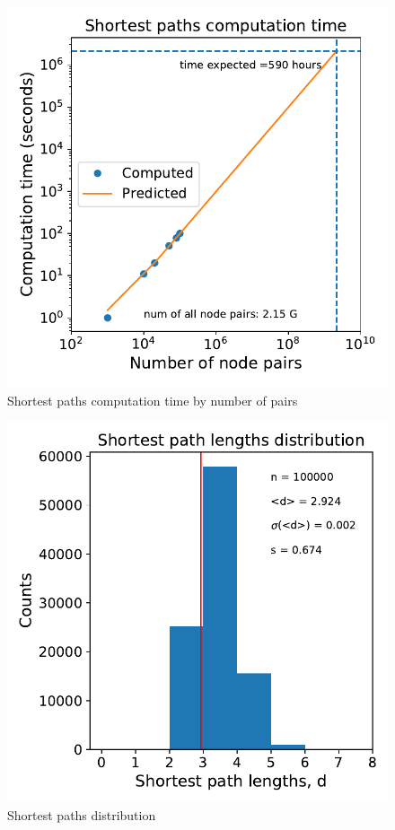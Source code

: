 \documentclass[12pt, twoside]{report}
\begin{document}
    
\begin{minipage}[b]{0.5\textwidth}
   \centering
    \begin{figure}[H]
      \includegraphics[width=\textwidth]{../../scripts/network_analysis/imgs/paths_computation_time.pdf}            
          \caption{Shortest paths computation time by number of pairs}
      \label{fig:path_time}
\end{figure}
\end{minipage}
\begin{minipage}[b]{0.5\textwidth}
  \begin{figure}[H]
  \centering
      \includegraphics[width=\textwidth]{../../scripts/network_analysis/imgs/paths_hist.pdf}            
        \caption{Shortest paths distribution}
\end{figure}
\end{minipage}
\end{document}
